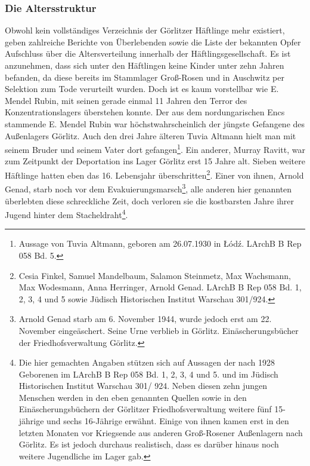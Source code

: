 \subsubsection{Die Altersstruktur}
Obwohl kein vollständiges Verzeichnis der Görlitzer Häftlinge mehr existiert, geben zahlreiche Berichte von Überlebenden sowie die Liste der bekannten Opfer Aufschluss über die Altersverteilung innerhalb der Häftlingsgesellschaft.
\newline
Es ist anzunehmen, dass sich unter den Häftlingen keine Kinder unter zehn Jahren befanden, da diese bereits im Stammlager Groß-Rosen und in Auschwitz per Selektion zum Tode verurteilt wurden.
Doch ist es kaum vorstellbar wie E. \mbox{Mendel} \mbox{Rubin}, mit seinen gerade einmal 11 Jahren den Terror des Konzentrationslagers überstehen konnte. Der aus dem nordungarischen Encs stammende E. Mendel Rubin war höchstwahrscheinlich der jüngste Gefangene des Außenlagers Görlitz. Auch den drei Jahre älteren Tuvia Altmann hielt man mit seinem Bruder und seinem Vater dort gefangen\footnote{Aussage von Tuvia Altmann, geboren am 26.07.1930 in \L \'od\'z. LArchB B Rep 058 Bd. 5.}. Ein anderer, Murray Ravitt, war zum Zeitpunkt der Deportation ins Lager Görlitz erst 15 Jahre alt. Sieben weitere Häftlinge hatten eben das 16. Lebensjahr überschritten\footnote{Cesia Finkel, Samuel Mandelbaum, Salamon Steinmetz, Max Wachsmann, Max Wodesmann, Anna Herringer, Arnold Genad. LArchB B Rep 058 Bd. 1, 2, 3, 4 und 5 sowie Jüdisch Historischen Institut Warschau 301/924.}. Einer von ihnen, Arnold Genad, starb noch vor dem Evakuierungsmarsch\footnote{Arnold Genad starb am 6. November 1944, wurde jedoch erst am 22. November eingeäschert. Seine Urne verblieb in Görlitz.  Einäscherungsbücher der Friedhofsverwaltung Görlitz.}, alle anderen hier genannten überlebten diese schreckliche Zeit, doch verloren sie die kostbarsten Jahre ihrer Jugend hinter dem Stacheldraht\footnote{Die hier gemachten Angaben stützen sich auf Aussagen der nach 1928 Geborenen im LArchB B Rep 058 Bd. 1, 2, 3, 4 und 5. und im Jüdisch Historischen Institut Warschau 301/ 924. Neben diesen zehn jungen Menschen werden in den eben genannten Quellen sowie in den Einäscherungsbüchern der Görlitzer Friedhofsverwaltung weitere fünf 15-jährige und sechs 16-Jährige erwähnt. Einige von ihnen kamen erst in den letzten Monaten vor Kriegsende aus anderen Groß-Rosener Außenlagern nach Görlitz. Es ist jedoch durchaus realistisch, dass es darüber hinaus noch weitere Jugendliche im Lager gab.}.

